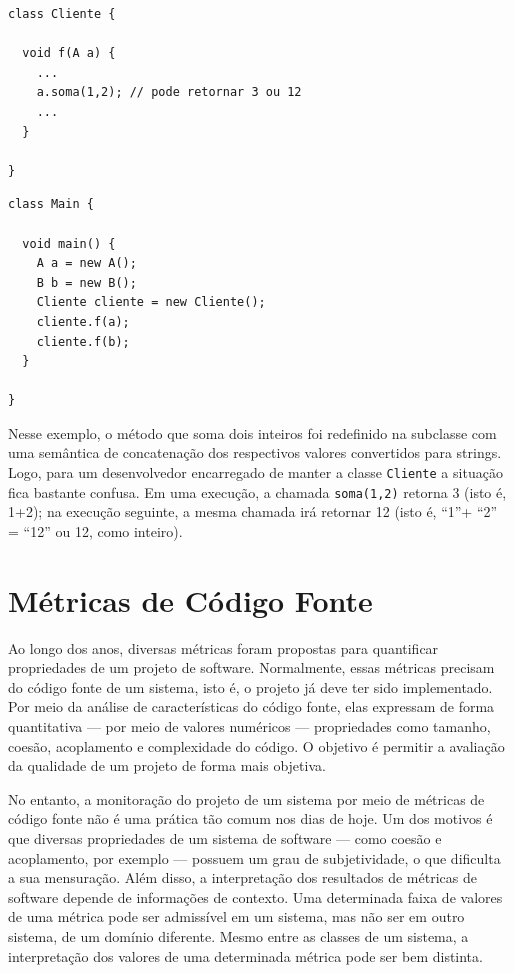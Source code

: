 \documentclass[
  11pt,
  twoside]{book}
\newcommand{\passthrough}[1]{#1}
\begin{document}
\begin{lstlisting}
class Cliente {

  void f(A a) {
    ...
    a.soma(1,2); // pode retornar 3 ou 12
    ...
  }

}
\end{lstlisting}

\begin{lstlisting}
class Main {

  void main() {
    A a = new A();
    B b = new B();
    Cliente cliente = new Cliente();
    cliente.f(a);
    cliente.f(b);
  }

}
\end{lstlisting}

Nesse exemplo, o método que soma dois inteiros foi redefinido na
subclasse com uma semântica de concatenação dos respectivos valores
convertidos para strings. Logo, para um desenvolvedor encarregado de
manter a classe \passthrough{\lstinline!Cliente!} a situação fica
bastante confusa. Em uma execução, a chamada
\passthrough{\lstinline!soma(1,2)!} retorna 3 (isto é, 1+2); na execução
seguinte, a mesma chamada irá retornar 12 (isto é, ``1''+ ``2'' = ``12''
ou 12, como inteiro).

\hypertarget{muxe9tricas-de-cuxf3digo-fonte}{%
\section{Métricas de Código
Fonte}\label{muxe9tricas-de-cuxf3digo-fonte}}


Ao longo dos anos, diversas métricas foram propostas para quantificar
propriedades de um projeto de software. Normalmente, essas métricas
precisam do código fonte de um sistema, isto é, o projeto já deve ter
sido implementado. Por meio da análise de características do código
fonte, elas expressam de forma quantitativa --- por meio de valores
numéricos --- propriedades como tamanho, coesão, acoplamento e
complexidade do código. O objetivo é permitir a avaliação da qualidade
de um projeto de forma mais objetiva.

No entanto, a monitoração do projeto de um sistema por meio de métricas
de código fonte não é uma prática tão comum nos dias de hoje. Um dos
motivos é que diversas propriedades de um sistema de software --- como
coesão e acoplamento, por exemplo --- possuem um grau de subjetividade,
o que dificulta a sua mensuração. Além disso, a interpretação dos
resultados de métricas de software depende de informações de contexto.
Uma determinada faixa de valores de uma métrica pode ser admissível em
um sistema, mas não ser em outro sistema, de um domínio diferente. Mesmo
entre as classes de um sistema, a interpretação dos valores de uma
determinada métrica pode ser bem distinta.
\end{document}
